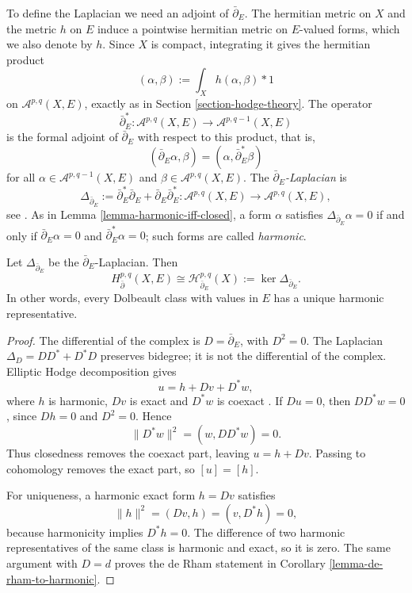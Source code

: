 \noindent
To define the Laplacian we need an adjoint
of $\bar\partial_E$. The hermitian metric on
$X$ and the metric $h$ on $E$ induce a
pointwise hermitian metric on $E$-valued
forms, which we also denote by $h$.
Since $X$ is compact, integrating it gives
the hermitian product
$$
(\alpha,\beta)
:=
\int_X h(\alpha,\beta)*1
$$
on $\mathcal A^{p,q}(X,E)$, exactly as in
Section \ref{section-hodge-theory}. The
operator
$$
\bar\partial_E^*:
\mathcal A^{p,q}(X,E)\to
\mathcal A^{p,q-1}(X,E)
$$
is the formal adjoint of $\bar\partial_E$
with respect to this product, that is,
$$
(\bar\partial_E\alpha,\beta)
=
(\alpha,\bar\partial_E^*\beta)
$$
for all $\alpha\in\mathcal A^{p,q-1}(X,E)$
and $\beta\in\mathcal A^{p,q}(X,E)$.
The {\it $\bar\partial_E$-Laplacian} is
$$
\Delta_{\bar\partial_E}
:=
\bar\partial_E^*\bar\partial_E
+
\bar\partial_E\bar\partial_E^*:
\mathcal A^{p,q}(X,E)\to
\mathcal A^{p,q}(X,E),
$$
see \cite[Section 4.1]{huc}. As in Lemma
\ref{lemma-harmonic-iff-closed}, a form
$\alpha$ satisfies
$\Delta_{\bar\partial_E}\alpha=0$ if and
only if $\bar\partial_E\alpha=0$ and
$\bar\partial_E^*\alpha=0$; such forms are
called {\it harmonic}.

\begin{theorem}
\label{theorem-bundle-valued-hodge}
Let $\Delta_{\bar\partial_E}$ be the
$\bar\partial_E$-Laplacian. Then
$$
H^{p,q}_{\bar\partial}(X,E)
\cong
\mathcal H^{p,q}_{\bar\partial_E}(X)
:=
\ker\Delta_{\bar\partial_E}.
$$
In other words, every Dolbeault class with
values in $E$ has a unique harmonic
representative.
\end{theorem}

\begin{proof}
The differential of the complex is
$D=\bar\partial_E$, with $D^2=0$.
The Laplacian $\Delta_D=DD^*+D^*D$
preserves bidegree; it is not the
differential of the complex.
Elliptic Hodge decomposition gives
$$
u=h+Dv+D^*w,
$$
where $h$ is harmonic, $Dv$ is exact and
$D^*w$ is coexact
\cite[Section 4.1]{huc}.
If $Du=0$, then $DD^*w=0$, since
$Dh=0$ and $D^2=0$. Hence
$$
\|D^*w\|^2=(w,DD^*w)=0.
$$
Thus closedness removes the coexact part,
leaving $u=h+Dv$.
Passing to cohomology removes the exact
part, so $[u]=[h]$.

For uniqueness, a harmonic exact form
$h=Dv$ satisfies
$$
\|h\|^2=(Dv,h)=(v,D^*h)=0,
$$
because harmonicity implies $D^*h=0$.
The difference of two harmonic
representatives of the same class is
harmonic and exact, so it is zero.
The same argument with $D=d$ proves the
de Rham statement in Corollary
\ref{lemma-de-rham-to-harmonic}.
\end{proof}

